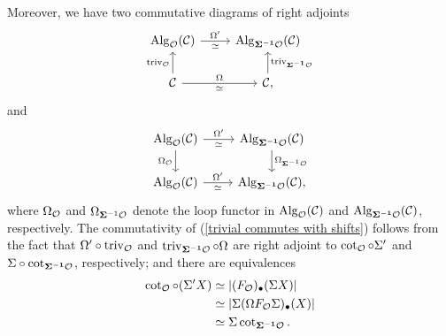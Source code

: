 Moreover, 
we have two commutative diagrams of right adjoints
\begin{equation}
    \label{trivial commutes with shifts}
    \begin{tikzcd}
	\Alg_{\CO}(\CC)    & \Alg_{\bf{\Sigma}^{-1} \CO }(\CC) \\
	 \CC & \CC
	\arrow[from=1-1, to = 1-2, "\Omega'", "\simeq" below]
	\arrow[from=2-1 , to =1-1, "\trivial_{\CO}" left]
	\arrow[from=2-2 , to =1-2,  "\trivial_{\bf{\Sigma}^{-1} \CO }" right]
	\arrow[from=2-1, to=2-2, "\Omega", "\simeq" below],
\end{tikzcd}
\end{equation}
and 
\begin{equation}
    \label{diagram of equivalences in shifting}
    \begin{tikzcd}
	\Alg_{\CO}(\CC)    & \Alg_{\bf{\Sigma}^{-1} \CO }(\CC) \\
	 \Alg_{\CO}(\CC) & \Alg_{\bf{\Sigma}^{-1} \CO }(\CC)
	\arrow[from=1-1, to = 1-2, "\Omega'", "\simeq" below]
	\arrow[from=1-1 , to =2-1, "\Omega_{\CO}" left]
	\arrow[from=1-2 , to =2-2, "\Omega_{\mathbf{\Sigma}^{-1} \CO}" right]
	\arrow[from=2-1, to=2-2, "\Omega'", "\simeq" below],
\end{tikzcd}
\end{equation}
where $\Omega_{{\mathcal{O}}}$ and $\Omega_{\mathbf{\Sigma}^{-1} {\mathcal{O}}}$ denote the loop functor in $\operatorname{Alg}_{{\mathcal{O}}}({\mathcal{C}})$ and $\operatorname{Alg}_{\bf{\Sigma}^{-1} {\mathcal{O}} }({\mathcal{C}}) $, respectively.
The commutativity of (\ref{trivial commutes with shifts}) follows from the fact that $\Omega' \circ \operatorname{triv}_{{\mathcal{O}}}$ and $\operatorname{triv}_{\bf{\Sigma}^{-1} {\mathcal{O}} }\circ \Omega$ are right adjoint to $ \cot_{{\mathcal{O}}}\circ \Sigma'$ and $\Sigma \circ \cot_{\bf{\Sigma}^{-1} {\mathcal{O}}}$, respectively; and there are equivalences
\begin{align*}
    \cot_{{\mathcal{O}}}\circ (\Sigma' X) & \simeq |(F_{{\mathcal{O}}})_{\bullet} (\Sigma X)|\\
    & \simeq |\Sigma (\Omega F_{{\mathcal{O}}}\Sigma)_{\bullet} (X) |\\
    & \simeq \Sigma \cot_{\bf{\Sigma}^{-1} {\mathcal{O}}}.
\end{align*}

